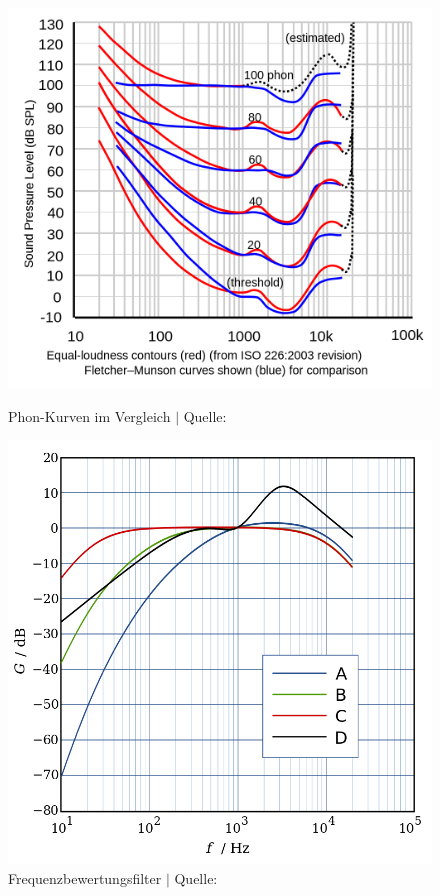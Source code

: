 \documentclass[12pt]{article}
\begin{document}
	\begin{figure}[H]
		\centering
		\begin{minipage}{.5\textwidth}
			\centering
			\includegraphics[width=1\linewidth]{images/phon-curve}
			\caption{Phon-Kurven im Vergleich $\vert$ Quelle: \cite{impairments_basics_2004}}
			\label{fig:phon-curve}
		\end{minipage}%
		\begin{minipage}{.5\textwidth}
			\centering
			\includegraphics[width=1\linewidth]{images/Frequenzbewertung}
			\caption{Frequenzbewertungsfilter $\vert$ Quelle: \cite{noauthor_frequenzbewertung_2023}}
			\label{fig:frequenzbewertung}
		\end{minipage}
	\end{figure}
	
\end{document}
